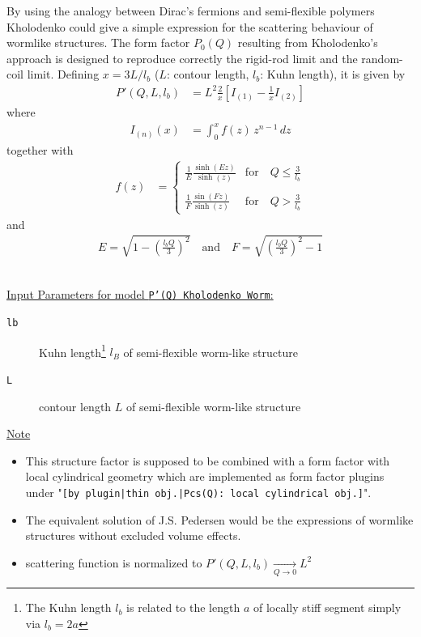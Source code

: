 By using the analogy between Dirac's fermions
and semi-flexible polymers
Kholodenko \cite{kholodenko93} could give a simple expression for the
scattering behaviour of wormlike structures. The form factor $P_0(Q)$ resulting
from Kholodenko's approach is designed to reproduce
correctly the rigid-rod limit and the random-coil limit.
Defining $x = 3L/l_b$ ($L$: contour length, $l_b$: Kuhn length), it is given by
\begin{align}
P'(Q,L,l_b) &= L^2\frac{2}{x} \left[I_{(1)} -\frac{1}{x}I_{(2)}\right]
\label{eq:KholodenkoPprime}
\end{align}
where
\begin{align}
I_{(n)}(x) &= \int_0^x  f(z) \, z^{n-1} \, dz
\end{align}
together with
\begin{align}
f(z) &=
\begin{cases} \displaystyle
\frac{1}{E}\frac{\sinh(Ez)}{\sinh(z)} & \text{for} \quad \displaystyle Q \leq \frac{3}{l_b}\\ \\
\displaystyle
\frac{1}{F}\frac{\sin(Fz)}{\sinh(z)} & \text{for} \quad \displaystyle Q > \frac{3}{l_b}
\end{cases}
\end{align}
and
\begin{align}
E = \sqrt{1-\left(\frac{l_bQ}{3}\right)^2} \quad \text{and} \quad F = \sqrt{\left(\frac{l_bQ}{3}\right)^2-1}
\end{align}

\vspace{5mm}

\hspace{1pt}\\
\uline{Input Parameters for model \texttt{P'(Q) Kholodenko Worm}:}\\
\begin{description}
\item[\texttt{lb}] Kuhn length\footnote{The Kuhn length $l_b$ is related to the length $a$ of
    locally stiff segment simply via $l_b=2a$} $l_B$ of semi-flexible worm-like structure
\item[\texttt{L}] contour length $L$ of semi-flexible worm-like structure
\end{description}

\noindent
\uline{Note}
\begin{itemize}
  \item This structure factor is supposed to be combined with a form factor with local cylindrical geometry which are implemented as form factor plugins
under "\texttt{[by plugin|thin obj.|Pcs(Q): local cylindrical obj.]}".
\item The equivalent solution of J.S. Pedersen \cite{Pedersen96Macrom} would be the expressions of wormlike structures without excluded volume effects.
  \item scattering function is normalized to $P'(Q,L,l_b) \xrightarrow[Q\rightarrow 0]{} L^2$
\end{itemize}

